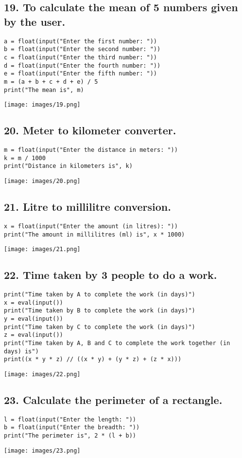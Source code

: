 \documentclass[12pt]{article}
\begin{document}
\subsection*{19. To calculate the mean of 5 numbers given by the user.}
\begin{verbatim}
a = float(input("Enter the first number: "))
b = float(input("Enter the second number: "))
c = float(input("Enter the third number: "))
d = float(input("Enter the fourth number: "))
e = float(input("Enter the fifth number: "))
m = (a + b + c + d + e) / 5
print("The mean is", m)
\end{verbatim}
\texttt{[image: images/19.png]}

\subsection*{20. Meter to kilometer converter.}
\begin{verbatim}
m = float(input("Enter the distance in meters: "))
k = m / 1000
print("Distance in kilometers is", k)
\end{verbatim}
\texttt{[image: images/20.png]}

\subsection*{21. Litre to millilitre conversion.}
\begin{verbatim}
x = float(input("Enter the amount (in litres): "))
print("The amount in millilitres (ml) is", x * 1000)
\end{verbatim}
\texttt{[image: images/21.png]}

\subsection*{22. Time taken by 3 people to do a work.}
\begin{verbatim}
print("Time taken by A to complete the work (in days)")
x = eval(input())
print("Time taken by B to complete the work (in days)")
y = eval(input())
print("Time taken by C to complete the work (in days)")
z = eval(input())
print("Time taken by A, B and C to complete the work together (in days) is")
print((x * y * z) // ((x * y) + (y * z) + (z * x)))
\end{verbatim}
\texttt{[image: images/22.png]}

\subsection*{23. Calculate the perimeter of a rectangle.}
\begin{verbatim}
l = float(input("Enter the length: "))
b = float(input("Enter the breadth: "))
print("The perimeter is", 2 * (l + b))
\end{verbatim}
\texttt{[image: images/23.png]}
\end{document}
